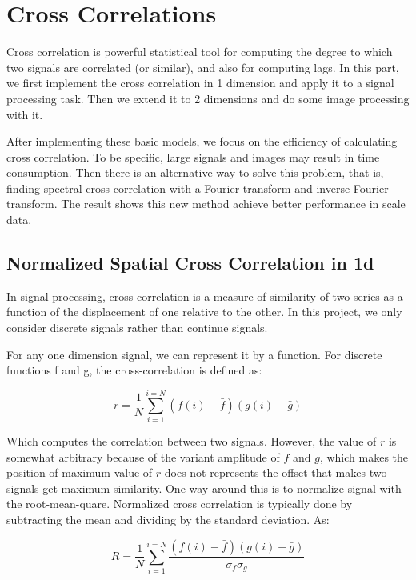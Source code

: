 \chapter{Cross Correlations}\label{chp:1}

Cross correlation is powerful statistical tool for computing the degree to which two signals are correlated (or similar), and also for computing lags. In this part, we first implement the cross correlation in 1 dimension and apply it to a signal processing task. Then we extend it to 2 dimensions and do some image processing with it. 

 After implementing these basic models, we focus on the efficiency of calculating cross correlation. To be specific, large signals and images may result in time consumption. Then there is an alternative way to solve this problem, that is, finding spectral cross correlation with a Fourier transform and inverse Fourier transform. The result shows this new method achieve better performance in scale data.

\section{Normalized Spatial Cross Correlation in 1d}

In signal processing, cross-correlation is a measure of similarity of two series as a function of the displacement of one relative to the other. In this project, we only consider discrete signals rather than continue signals.

For any one dimension signal, we can represent it by a function. For discrete functions f and g, the cross-correlation is defined as\cite{rabiner1975theory}\cite{rabiner1978digital}:

\begin{equation*}
r=\frac{1}{N}
\sum_{i=1}^{i=N}(f(i)-\bar{f})(g(i)-\bar{g})
\end{equation*}

Which computes the correlation between two signals. However, the value of $r$ is somewhat arbitrary because of the variant amplitude of $f$ and $g$, which makes the position of maximum value of $r$ does not represents the offset that makes two signals get maximum similarity. One way around this is to normalize signal with the root-mean-quare. Normalized cross correlation is typically done by subtracting the mean and dividing by the standard deviation. As:

\begin{equation*}
R=\frac{1}{N}
\sum_{i=1}^{i=N}
\frac{(f(i)-\bar{f})(g(i)-\bar{g})}{\sigma _{f}\sigma _{g}}
\end{equation*}

